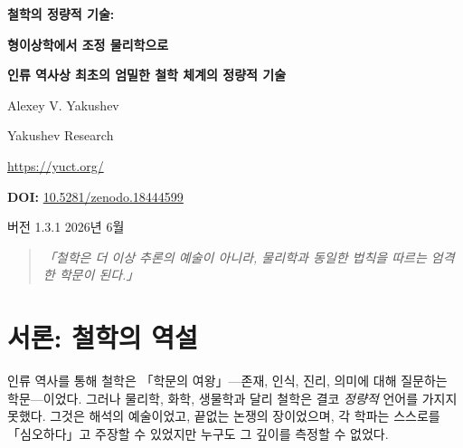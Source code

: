 \documentclass[11pt,a4paper]{article}
\begin{document}
	
	\begin{titlepage}
		\begin{center}
			\vspace*{1cm}
			{\Huge\bfseries\color{darkblue} 철학의 정량적 기술:\par}
			\vspace{0.3cm}
			{\Huge\bfseries\color{darkblue} 형이상학에서 조정 물리학으로\par}
			\vspace{1cm}
			{\Large\bfseries 인류 역사상 최초의 엄밀한 철학 체계의 정량적 기술\par}
			\vspace{1.5cm}
			{\large Alexey V. Yakushev\par}
			{\large Yakushev Research\par}
			{\large \url{https://yuct.org/}\par}
			\vspace{1cm}
			{\large \textbf{DOI:} \href{https://doi.org/10.5281/zenodo.18444599}{10.5281/zenodo.18444599}\par}
			\vspace{1cm}
			{\large 버전 1.3.1 \quad 2026년 6월\par}
			\vfill
			\begin{quote}
				\itshape
				「철학은 더 이상 추론의 예술이 아니라, 물리학과 동일한 법칙을 따르는 엄격한 학문이 된다.」
			\end{quote}
		\end{center}
	\end{titlepage}
	
	\tableofcontents
	\newpage
	
	\section{서론: 철학의 역설}
	
	인류 역사를 통해 철학은 「학문의 여왕」—존재, 인식, 진리, 의미에 대해 질문하는 학문—이었다. 그러나 물리학, 화학, 생물학과 달리 철학은 결코 \emph{정량적} 언어를 가지지 못했다. 그것은 해석의 예술이었고, 끝없는 논쟁의 장이었으며, 각 학파는 스스로를 「심오하다」고 주장할 수 있었지만 누구도 그 깊이를 측정할 수 없었다.
	
\end{document}
